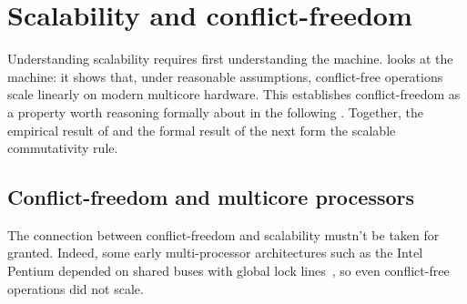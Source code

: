 \section{Scalability and conflict-freedom}
\label{sec:scalability}








Understanding scalability requires first understanding the machine.
%
 looks at the machine: it shows that, under
reasonable assumptions, conflict-free operations scale linearly on
modern multicore hardware.
%
This establishes conflict-freedom as a property worth reasoning
formally about in the following .  Together, the
empirical result of  and the formal result
of the next  form the scalable commutativity
rule.



\subsection{Conflict-freedom and multicore processors}

The connection between conflict-freedom and scalability mustn't be taken
for granted.  Indeed, some early multi-processor architectures such as
the Intel Pentium depended on shared buses with global lock
lines~\cite[\S8.1.4]{intel-sdm-3}, so even conflict-free operations
did not scale.

